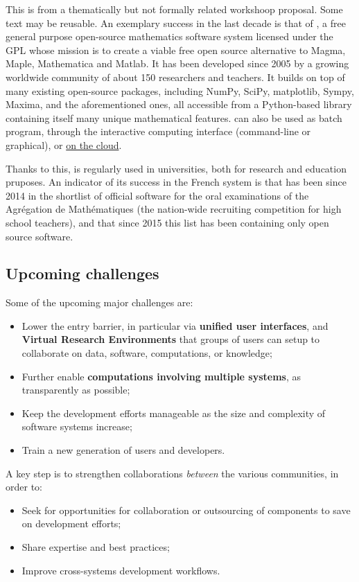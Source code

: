 \begin{oldpart}{This is from a thematically but not formally related workshoop proposal. Some text may be reusable.}
An exemplary success in the last decade is that of \Sage,
a free general purpose open-source mathematics
software system licensed under the GPL whose mission is to create a
viable free open source alternative to Magma, Maple, Mathematica and
Matlab. It has been developed since 2005 by a growing worldwide community of
about 150 researchers and teachers. It builds on top of many existing
open-source packages, including NumPy, SciPy, matplotlib, Sympy,
Maxima, and the aforementioned ones, all accessible from a
Python-based library containing itself many unique mathematical
features. \Sage can also be used as batch program, through the
\Jupyter interactive computing interface (command-line or graphical),
or \href{cloud.sagemath.org}{on the cloud}.

Thanks to this, \Sage is regularly used in universities, both for
research and education pruposes.  An indicator of its success in the French
system is that \Sage has been since 2014 in the shortlist of official
software for the oral examinations of the Agrégation de Mathématiques
(the nation-wide recruiting competition for high school teachers), and
that since 2015 this list has been containing only open source software.

\subsection{Upcoming challenges}

Some of the upcoming major challenges are:
\begin{itemize}
\item Lower the entry barrier, in particular via \textbf{unified user
    interfaces}, and \textbf{Virtual Research Environments} that
  groups of users can setup to collaborate on data, software,
  computations, or knowledge;
\item Further enable \textbf{computations involving multiple systems},
  as transparently as possible;
\item Keep the development efforts manageable as the size and
  complexity of software systems increase;
\item Train a new generation of users and developers.
\end{itemize}

A key step is to strengthen collaborations \emph{between} the various
communities, in order to:
\begin{itemize}
\item Seek for opportunities for collaboration or outsourcing of
  components to save on development efforts;
\item Share expertise and best practices;
\item Improve cross-systems development workflows.
\end{itemize}


\end{oldpart}
